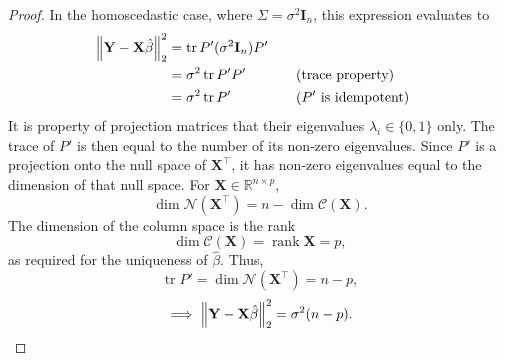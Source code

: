 \documentclass[letterpaper, reqno]{amsart}
\numberwithin{equation}{section}
\DeclarePairedDelimiter{\norm}{\lVert}{\rVert}
\newcommand{\T}{\top} %
\newcommand{\vect}[1]{\boldsymbol{\mathbf{#1}}} %
\newcommand{\R}{\mathbb{R}}  %
\newcommand{\by}[1]{&\quad&\text{(#1)}}
\newcommand{\Xm}{\vect{X}}
\newcommand{\Yv}{\vect{Y}}
\newcommand{\Bvh}{\hat{\beta}}
\DeclareMathOperator{\tr}{tr}
\DeclareMathOperator{\rank}{rank}
\begin{document}
\begin{proof}
  In the homoscedastic case, where $\Sigma = \sigma^2 \vect{I}_n$, this expression
  evaluates to 
  \begin{alignat*}{3}
    \norm*{\Yv - \Xm\Bvh}_2^2 &= \tr P'(\sigma^2 \vect{I}_n) P' \\
    &= \sigma^2 \tr P' P' \by{trace property} \\
    &= \sigma^2 \tr P' \by {$P'$ is idempotent}
  \end{alignat*}
  It is property of projection matrices that their eigenvalues $\lambda_i \in
  \{0, 1\}$ only.
  The trace of $P'$ is then equal to the number of its non-zero eigenvalues.
  Since $P'$ is a projection onto the null space of $\Xm^\T$, it has non-zero
  eigenvalues equal to the dimension of that null space.
  For $\Xm \in \R^{n \times p}$,
  \[ \dim\mathscr{N}(\Xm^\T) = n - \dim \mathscr{C}(\Xm). \]
  The dimension of the column space is the rank
  \[ \dim \mathscr{C}(\Xm) = \rank \Xm = p, \]
  as required for the uniqueness of $\Bvh$. Thus,
  \[ \tr P' = \dim\mathscr{N}(\Xm^\T) = n - p, \]
  \[ \implies \norm*{\Yv - \Xm\Bvh}_2^2 = \sigma^2 (n - p). \qedhere \]
\end{proof}
\end{document}
